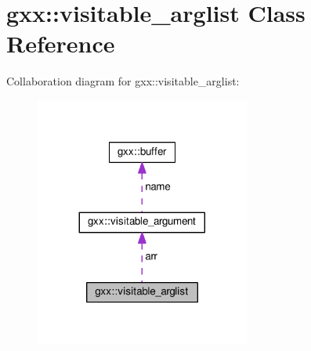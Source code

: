 \hypertarget{classgxx_1_1visitable__arglist}{}\section{gxx\+:\+:visitable\+\_\+arglist Class Reference}
\label{classgxx_1_1visitable__arglist}


Collaboration diagram for gxx\+:\+:visitable\+\_\+arglist\+:\nopagebreak
\begin{figure}[H]
\begin{center}
\leavevmode
\includegraphics[width=200pt]{classgxx_1_1visitable__arglist__coll__graph}
\end{center}
\end{figure}
